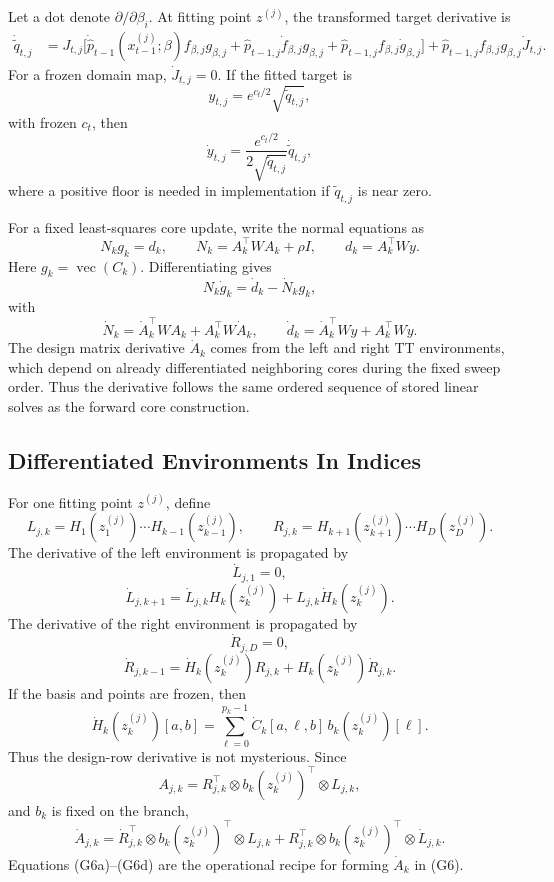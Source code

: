 \documentclass[11pt]{article}
\newcommand{\vecop}{\operatorname{vec}}
\begin{document}
Let a dot denote \(\partial/\partial\beta_i\).  At fitting point \(z^{(j)}\),
the transformed target derivative is
\[
\begin{aligned}
 \dot{\widetilde q}_{t,j}
 &=
 J_{t,j}
 \Big[
 \dot{\widehat p}_{t-1}(x_{t-1}^{(j)};\beta)
 f_{\beta,j}g_{\beta,j}
 + \widehat p_{t-1,j}\dot f_{\beta,j}g_{\beta,j}
 + \widehat p_{t-1,j}f_{\beta,j}\dot g_{\beta,j}
 \Big]
 + \widehat p_{t-1,j}f_{\beta,j}g_{\beta,j}\dot J_{t,j}.
\end{aligned}
\tag{G2}
\]
For a frozen domain map, \(\dot J_{t,j}=0\).  If the fitted target is
\[
    y_{t,j}=e^{c_t/2}\sqrt{\widetilde q_{t,j}},
\]
with frozen \(c_t\), then
\[
    \dot y_{t,j}
    =
    \frac{e^{c_t/2}}{2\sqrt{\widetilde q_{t,j}}}
    \dot{\widetilde q}_{t,j},
    \tag{G3}
\]
where a positive floor is needed in implementation if \(\widetilde q_{t,j}\) is
near zero.

For a fixed least-squares core update, write the normal equations as
\[
    N_k g_k=d_k,
    \qquad
    N_k=A_k^\top W A_k+\rho I,
    \qquad
    d_k=A_k^\top W y.
    \tag{G4}
\]
Here \(g_k=\vecop(C_k)\).  Differentiating gives
\[
    N_k\dot g_k
    =
    \dot d_k-\dot N_k g_k,
    \tag{G5}
\]
with
\[
    \dot N_k
    =
    \dot A_k^\top W A_k+A_k^\top W\dot A_k,
    \qquad
    \dot d_k
    =
    \dot A_k^\top Wy+A_k^\top W\dot y.
    \tag{G6}
\]
The design matrix derivative \(\dot A_k\) comes from the left and right TT
environments, which depend on already differentiated neighboring cores during
the fixed sweep order.  Thus the derivative follows the same ordered sequence
of stored linear solves as the forward core construction.

\subsection{Differentiated Environments In Indices}

For one fitting point \(z^{(j)}\), define
\[
    L_{j,k}=H_1(z_1^{(j)})\cdots H_{k-1}(z_{k-1}^{(j)}),
    \qquad
    R_{j,k}=H_{k+1}(z_{k+1}^{(j)})\cdots H_D(z_D^{(j)}).
\]
The derivative of the left environment is propagated by
\[
    \dot L_{j,1}=0,
\]
\[
    \dot L_{j,k+1}
    =
    \dot L_{j,k}H_k(z_k^{(j)})
    +
    L_{j,k}\dot H_k(z_k^{(j)}).
    \tag{G6a}
\]
The derivative of the right environment is propagated by
\[
    \dot R_{j,D}=0,
\]
\[
    \dot R_{j,k-1}
    =
    \dot H_k(z_k^{(j)})R_{j,k}
    +
    H_k(z_k^{(j)})\dot R_{j,k}.
    \tag{G6b}
\]
If the basis and points are frozen, then
\[
    \dot H_k(z_k^{(j)})[a,b]
    =
    \sum_{\ell=0}^{p_k-1}
    \dot C_k[a,\ell,b]\,b_k(z_k^{(j)})[\ell].
    \tag{G6c}
\]
Thus the design-row derivative is not mysterious.  Since
\[
    A_{j,k}=R_{j,k}^\top\otimes b_k(z_k^{(j)})^\top\otimes L_{j,k},
\]
and \(b_k\) is fixed on the branch,
\[
    \dot A_{j,k}
    =
    \dot R_{j,k}^{\top}\otimes b_k(z_k^{(j)})^\top\otimes L_{j,k}
    +
    R_{j,k}^{\top}\otimes b_k(z_k^{(j)})^\top\otimes \dot L_{j,k}.
    \tag{G6d}
\]
Equations (G6a)--(G6d) are the operational recipe for forming
\(\dot A_k\) in (G6).
\end{document}
